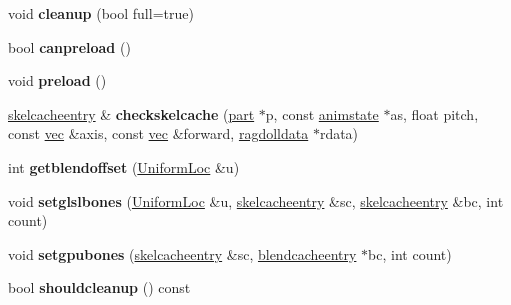 \begin{DoxyCompactItemize}
\item 
\mbox{\label{structskelmodel_1_1skeleton_ad0f66917b115147b50a8237cfbd41619}} 
void {\bfseries cleanup} (bool full=true)
\item 
\mbox{\label{structskelmodel_1_1skeleton_a2eaa878045863ea58ae7a0ad6bddb778}} 
bool {\bfseries canpreload} ()
\item 
\mbox{\label{structskelmodel_1_1skeleton_a7813160480f5a320ce10fbbcfda770e4}} 
void {\bfseries preload} ()
\item 
\mbox{\label{structskelmodel_1_1skeleton_a0d5c3c19de45079470695f05172a987f}} 
\hyperlink{structskelmodel_1_1skelcacheentry}{skelcacheentry} \& {\bfseries checkskelcache} (\hyperlink{structanimmodel_1_1part}{part} $\ast$p, const \hyperlink{structanimmodel_1_1animstate}{animstate} $\ast$as, float pitch, const \hyperlink{structvec}{vec} \&axis, const \hyperlink{structvec}{vec} \&forward, \hyperlink{structragdolldata}{ragdolldata} $\ast$rdata)
\item 
\mbox{\label{structskelmodel_1_1skeleton_a761145d95787974993ebd03e988ddff8}} 
int {\bfseries getblendoffset} (\hyperlink{struct_uniform_loc}{Uniform\+Loc} \&u)
\item 
\mbox{\label{structskelmodel_1_1skeleton_a3db4b7ec7316350cb02ea026e88c775c}} 
void {\bfseries setglslbones} (\hyperlink{struct_uniform_loc}{Uniform\+Loc} \&u, \hyperlink{structskelmodel_1_1skelcacheentry}{skelcacheentry} \&sc, \hyperlink{structskelmodel_1_1skelcacheentry}{skelcacheentry} \&bc, int count)
\item 
\mbox{\label{structskelmodel_1_1skeleton_ab599ec34d9e13e47114be147e2ad1175}} 
void {\bfseries setgpubones} (\hyperlink{structskelmodel_1_1skelcacheentry}{skelcacheentry} \&sc, \hyperlink{structskelmodel_1_1blendcacheentry}{blendcacheentry} $\ast$bc, int count)
\item 
\mbox{\label{structskelmodel_1_1skeleton_a174e0e7662f3d4b2af7e80ab766146d6}} 
bool {\bfseries shouldcleanup} () const
\end{DoxyCompactItemize}
